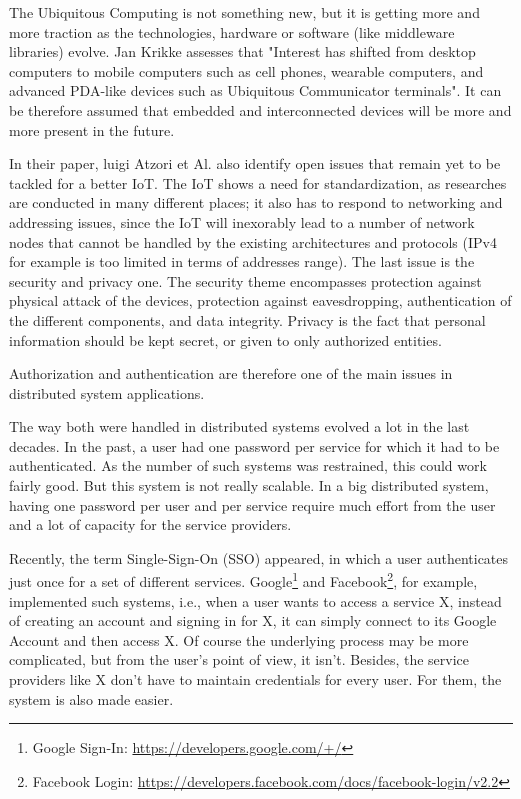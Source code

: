 The Ubiquitous Computing is not something new, but it is getting more and more traction as the technologies, hardware or software (like middleware libraries) evolve. Jan Krikke assesses that "Interest has shifted from desktop computers to mobile computers such as cell phones, wearable computers, and advanced PDA-like devices such as Ubiquitous Communicator terminals"\cite{Krikke2005}. It can be therefore assumed that embedded and interconnected devices will be more and more present in the future.

In their paper, luigi Atzori et Al. also identify open issues that remain yet to be tackled for a better IoT. The IoT shows a need for standardization, as researches are conducted in many different places; it also has to respond to networking and addressing issues, since the IoT will inexorably lead to a number of network nodes that cannot be handled by the existing architectures and protocols (IPv4 for example is too limited in terms of addresses range). The last issue is the security and privacy one. The security theme encompasses protection against physical attack of the devices,  protection against eavesdropping, authentication of the different components, and data integrity. Privacy is the fact that personal information should be kept secret, or given to only authorized entities. 

Authorization and authentication are therefore one of the main issues in distributed system applications. 

The way both were handled in distributed systems evolved a lot in the last decades. In the past, a user had one password per service for which it had to be authenticated. As the number of such systems was restrained, this could work fairly good. But this system is not really scalable. In a big distributed system, having one password per user and per service require much effort from the user and a lot of capacity for the service providers. 

Recently, the term Single-Sign-On (SSO) appeared, in which a user authenticates just once for a set of different services. Google\footnote{Google Sign-In:  \url{https://developers.google.com/+/}} and Facebook\footnote{Facebook Login: \url{https://developers.facebook.com/docs/facebook-login/v2.2}}, for example, implemented such systems, i.e., when a user wants to access a service X, instead of creating an account and signing in for X, it can simply connect to its Google Account and then access X. Of course the underlying process may be more complicated, but from the user's point of view, it isn't. Besides, the service providers like X don't have to maintain credentials for every user. For them, the system is also made easier.

